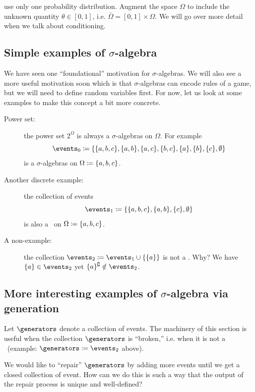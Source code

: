 \documentclass{article}
\begin{document}
 use only one probability distribution. Augment the space $\Omega$ to include the unknown quantity $\theta \in [0, 1]$, i.e. $\bar \Omega = [0, 1] \times \Omega$. We will go over more detail when we talk about conditioning.


\subsection{Simple examples of $\sigma$-algebra}

We have seen one ``foundational'' motivation for $\sigma$-algebras. We will also see a more useful motivation soon which is that $\sigma$-algebras can encode rules of a game, but we will need to define random variables first. For now, let us look at some examples to make this concept a bit more concrete.

\begin{description}
  \item[Power set:] the power set $2^\Omega$ is always a $\sigma$-algebras on $\Omega$. For example \[\events_0 \defeq \{\{a, b, c\}, \{a, b\}, \{a, c\}, \{b, c\}, \{a\}, \{b\}, \{c\}, \emptyset\}\] is a $\sigma$-algebras on $\Omega \coloneqq \{a, b, c\}$.
  \item[Another discrete example:] the collection of events \[\events_1 \defeq \{\{a, b, c\}, \{a, b\}, \{c\}, \emptyset\}\] is also a \sigmaalg\ on $\Omega \coloneqq \{a, b, c\}$.
  \item[A non-example:] the collection $\events_2 \defeq \events_1 \cup \{\{a\}\}$ is not a \sigmaalg. Why? We have $\{a\} \in \events_2$ yet $\{a\}^\complement \notin \events_2$.
\end{description}


\subsection{More interesting examples of $\sigma$-algebra via generation}\label{sec:generated}

Let $\generators$ denote a collection of events. The machinery of this section is useful when the collection $\generators$ is ``broken,'' i.e. when it is not  a \sigmaalg\ (example: $\generators \defeq \events_2$ above). 

We would like to ``repair'' $\generators$ by adding more events until we get a closed collection of event. How can we do this is such a way that the output of the repair process is unique and well-defined? 
\end{document}
